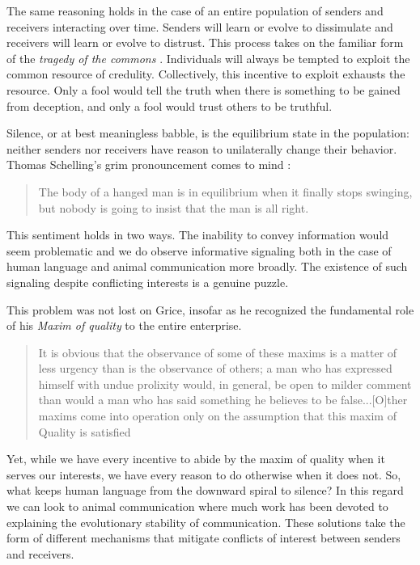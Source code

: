 \documentclass[linguex]{sp}
\theoremstyle{definition} \newtheorem{definition}{Definition}
\begin{document}
The same reasoning holds in the case of an entire population of senders and receivers interacting over time. Senders will learn or evolve to dissimulate and receivers will learn or evolve to distrust. This process takes on the familiar form of the \emph{tragedy of the commons} \citep{hardin:1968}. Individuals will always be tempted to exploit the common resource of credulity. Collectively, this incentive to exploit exhausts the resource. Only a fool would tell the truth when there is something to be gained from deception, and only a fool would trust others to be truthful. 

Silence, or at best meaningless babble, is the equilibrium state in the population: neither senders nor receivers have reason to unilaterally change their behavior. Thomas Schelling's grim pronouncement comes to mind \citeyearpar[26]{schelling:1978}:  

\begin{quote}
The body of a hanged man is in equilibrium when it finally stops swinging, but nobody is going to insist that the man is all right.
\end{quote}
This sentiment holds in two ways. The inability to convey information would seem problematic and we do observe informative signaling both in the case of human language and animal communication more broadly. The existence of such signaling despite conflicting interests is a genuine puzzle.

This problem was not lost on Grice, insofar as he recognized the fundamental role of his \emph{Maxim of quality} to the entire enterprise.

\begin{quote}
It is obvious that the observance of some of these maxims is a matter of less urgency than is the observance of others; a man who has expressed himself with undue prolixity would, in general, be open to milder comment than would a man who has said something he believes to be false...[O]ther maxims come into operation only on the assumption that this maxim of Quality is satisfied \citep[27]{grice1975}
\end{quote}
Yet, while we have every incentive to abide by the maxim of quality when it serves our interests, we have every reason to do otherwise when it does not. So, what keeps human language from the downward spiral to silence? In this regard we can look to animal communication where much work has been devoted to explaining the evolutionary stability of communication. These solutions take the form of different mechanisms that mitigate conflicts of interest between senders and receivers. 
\end{document}
